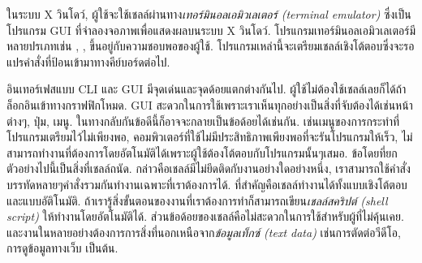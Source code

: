 \begin{thwbr}
ในระบบ X วินโดว์, ผู้ใช้จะใช้เชลล์ผ่านทาง\emph{เทอร์มินอลเอมิวเลเตอร์ (terminal emulator)} %
%
ซึ่งเป็นโปรแกรม GUI ที่จำลองจอภาพเพื่อแสดงผลบนระบบ X วินโดว์. โปรแกรมเทอร์มินอลเอมิวเลเตอร์มีหลายปรเภทเช่น , ,  ขึ้นอยู่กับความชอบพอของผู้ใช้. โปรแกรมเหล่านี้จะเตรียมเชลล์เชิงโต้ตอบซึ่งจะรอแปรคำสั่งที่ป้อนเข้ามาทางคีย์บอร์ดต่อไป.


\begin{figure}[!tb]
\end{figure}

อินเทอร์เฟสแบบ CLI และ GUI มีจุดเด่นและจุดด้อยแตกต่างกันไป. ผู้ใช้ไม่ต้องใช้เชลล์เลยก็ได้ถ้าล็อกอินเข้าทางกราฟฟิกโหมด. GUI สะดวกในการใช้เพราะเราเห็นทุกอย่างเป็นสิ่งที่จับต้องได้เช่นหน้าต่างๆ, ปุ่ม, เมนู. ในทางกลับกันข้อดีนี้ก็อาจจะกลายเป็นข้อด้อยได้เช่นกัน. เช่นเมนูของการกระทำที่โปรแกรมเตรียมไว้ไม่เพียงพอ, คอมพิวเตอร์ที่ใช้ไม่มีประสิทธิภาพเพียงพอที่จะรันโปรแกรมให้เร็ว, ไม่สามารถทำงานที่ต้องการโดยอัตโนมัติได้เพราะผู้ใช้ต้องโต้ตอบกับโปรแกรมนั้นๆเสมอ. ข้อโดยที่ยกตัวอย่างไปนี้เป็นสิ่งที่เชลล์ถนัด. กล่าวคือเชลล์มีไม่ยึดติดกับงานอย่างใดอย่างหนึ่ง, เราสามารถใช้คำสั่งบรรทัดหลายๆคำสั่งรวมกันทำงานเฉพาะที่เราต้องการได้. ที่สำคัญคือเชลล์ทำงานได้ทั้งแบบเชิงโต้ตอบและแบบอัติโนมัติ. ถ้าเรารู้สิ่งขั้นตอนของงานที่เราต้องการทำก็สามารถเขียน\emph{เชลล์สคริปต์ (shell script)} %
%
ให้ทำงานโดยอัตโนมัติได้. ส่วนข้อด้อยของเชลล์คือไม่สะดวกในการใช้สำหรับผู้ที่ไม่คุ้นเคย.  และงานในหลายอย่างต้องการการสิ่งที่นอกเหนือจาก\emph{ข้อมูลเท็กซ์ (text data)} %
%
เช่นการตัดต่อวีดีโอ, การดูข้อมูลทางเว็บ เป็นต้น. 



\end{thwbr}
